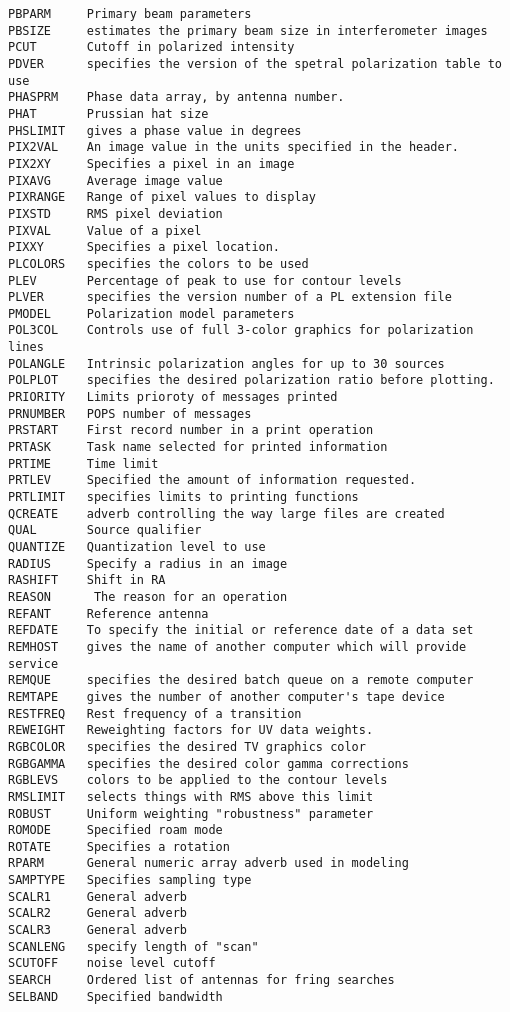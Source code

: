 \begin{verbatim}
PBPARM     Primary beam parameters
PBSIZE     estimates the primary beam size in interferometer images
PCUT       Cutoff in polarized intensity
PDVER      specifies the version of the spetral polarization table to use
PHASPRM    Phase data array, by antenna number.
PHAT       Prussian hat size
PHSLIMIT   gives a phase value in degrees
PIX2VAL    An image value in the units specified in the header.
PIX2XY     Specifies a pixel in an image
PIXAVG     Average image value
PIXRANGE   Range of pixel values to display
PIXSTD     RMS pixel deviation
PIXVAL     Value of a pixel
PIXXY      Specifies a pixel location.
PLCOLORS   specifies the colors to be used
PLEV       Percentage of peak to use for contour levels
PLVER      specifies the version number of a PL extension file
PMODEL     Polarization model parameters
POL3COL    Controls use of full 3-color graphics for polarization lines
POLANGLE   Intrinsic polarization angles for up to 30 sources
POLPLOT    specifies the desired polarization ratio before plotting.
PRIORITY   Limits prioroty of messages printed
PRNUMBER   POPS number of messages
PRSTART    First record number in a print operation
PRTASK     Task name selected for printed information
PRTIME     Time limit
PRTLEV     Specified the amount of information requested.
PRTLIMIT   specifies limits to printing functions
QCREATE    adverb controlling the way large files are created
QUAL       Source qualifier
QUANTIZE   Quantization level to use
RADIUS     Specify a radius in an image
RASHIFT    Shift in RA
REASON      The reason for an operation
REFANT     Reference antenna
REFDATE    To specify the initial or reference date of a data set
REMHOST    gives the name of another computer which will provide service
REMQUE     specifies the desired batch queue on a remote computer
REMTAPE    gives the number of another computer's tape device
RESTFREQ   Rest frequency of a transition
REWEIGHT   Reweighting factors for UV data weights.
RGBCOLOR   specifies the desired TV graphics color
RGBGAMMA   specifies the desired color gamma corrections
RGBLEVS    colors to be applied to the contour levels
RMSLIMIT   selects things with RMS above this limit
ROBUST     Uniform weighting "robustness" parameter
ROMODE     Specified roam mode
ROTATE     Specifies a rotation
RPARM      General numeric array adverb used in modeling
SAMPTYPE   Specifies sampling type
SCALR1     General adverb
SCALR2     General adverb
SCALR3     General adverb
SCANLENG   specify length of "scan"
SCUTOFF    noise level cutoff
SEARCH     Ordered list of antennas for fring searches
SELBAND    Specified bandwidth

\end{verbatim}
